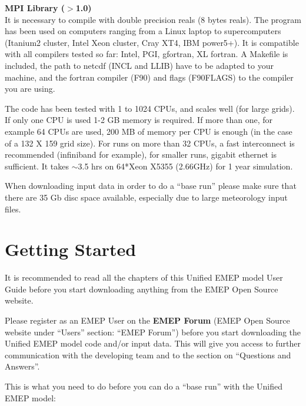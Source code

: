 \textbf{MPI Library ($>$1.0)}\\

It is necessary to compile with double precision reals (8 bytes
reals). The program has been used on computers ranging from a Linux laptop to supercomputers 
(Itanium2 cluster, Intel Xeon cluster, Cray XT4, IBM power5+). It is compatible with all 
compilers tested so far:  Intel, PGI, gfortran, XL fortran. A Makefile is included,  
the path to netcdf (INCL and LLIB) have to be adapted to your machine, and the fortran 
compiler (F90) and flags (F90FLAGS) to the compiler you are using.



The code has been tested with 1 to 1024 CPUs, and scales well (for large grids).  If only one 
CPU is used 1-2 GB memory is required. If more than one,
for example 64 CPUs are used, 200 MB of memory per CPU is enough (in
the case of a 132 X 159 grid size). For runs on more than 32 CPUs, a fast interconnect is 
recommended (infiniband for example), for smaller runs, gigabit ethernet is sufficient. 
It takes $\sim$3.5 hrs on 64*Xeon X5355 (2.66GHz) for 1 year simulation.

When downloading input data in order to do a ``base run'' please make
sure that there are 35 Gb disc space available, especially due to
large meteorology input files.

 

\section{Getting Started}


It is recommended to read all the chapters of this Unified EMEP model
User Guide before you start downloading anything from the EMEP Open
Source website.

Please register as an EMEP User on the {\bf EMEP Forum}
(EMEP Open Source website under ``Users'' section: ``EMEP Forum'')
before you start downloading the Unified EMEP model code and/or input
data. This will give you access to further communication with the
developing team and to the section on ``Questions and Answers''. 


This is what you need to do before you can do a ``base run'' with the
Unified EMEP model:

